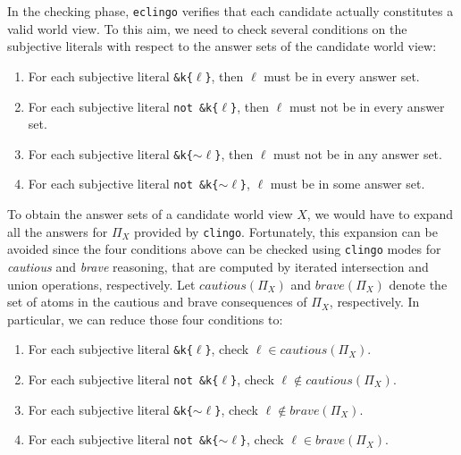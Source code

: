 \documentclass{new_tlp}
\newcommand{\sidecomment}[1]{\marginpar{\footnotesize \emph{\color{blue} #1}}}
\def\eclingo{{\tt eclingo}}
\def\clingo{{\tt clingo}}
\begin{document}

In the checking phase, \eclingo{} verifies that each candidate actually constitutes a valid world view.
%
To this aim, we need to check several conditions on the subjective literals with respect to the answer sets of the candidate world view:
%
\begin{enumerate}
    \item For each subjective literal \texttt{\&k\{$\ell$\}}, then $\ell$ must be in every answer set.

    \item For each subjective literal \texttt{not \&k\{$\ell$\}}, then $\ell$  must not be in every answer set.

    \item For each subjective literal \texttt{\&k\{$\sim \ell$\}}, then $\ell$ must not be in any answer set.

    \item For each subjective literal \texttt{not \&k\{$\sim \ell$\}}, $\ell$ must be in some answer set.
\end{enumerate}
To obtain the answer sets of a candidate world view $X$, we would have to expand all the answers for $\Pi_X$ provided by \clingo{}. 
%
Fortunately, this expansion can be avoided since the four conditions above can be checked using \clingo{} modes for \emph{cautious} and \emph{brave} reasoning, that are computed by iterated intersection and union operations, respectively.
%
Let $\mathit{cautious}(\Pi_X)$ and $\mathit{brave}(\Pi_X)$ denote the set of atoms in the cautious and brave consequences of $\Pi_X$, respectively.
In particular, we can reduce those four conditions to:
\begin{enumerate}
    \item For each subjective literal \texttt{\&k\{$\ell$\}}, check $\ell \in \mathit{cautious}(\Pi_X)$.

    \item For each subjective literal \texttt{not \&k\{$\ell$\}}, check $\ell \not\in \mathit{cautious}(\Pi_X)$.

    \item For each subjective literal \texttt{\&k\{$\sim \ell$\}}, check $\ell \not\in \mathit{brave}(\Pi_X)$.

    \item For each subjective literal \texttt{not \&k\{$\sim \ell$\}}, check $\ell \in \mathit{brave}(\Pi_X)$.
\end{enumerate}
\end{document}
